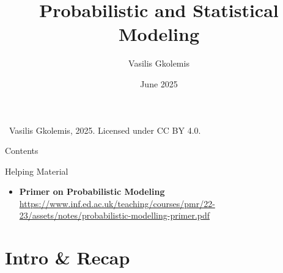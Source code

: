 \documentclass{beamer}
\title{Probabilistic and Statistical Modeling}
\author{Vasilis Gkolemis}
\institute{ATHENA RC | HUA}
\date{June 2025}
\begin{document}
\begin{frame}
  \titlepage
  \vfill
  \footnotesize
  \textcopyright\
  Vasilis Gkolemis, 2025. Licensed under CC BY 4.0.
\end{frame}

\begin{frame}{Contents}
  \tableofcontents
\end{frame}


\begin{frame}{Helping Material}
  \begin{itemize}
    \item \textbf{Primer on Probabilistic Modeling} \url{https://www.inf.ed.ac.uk/teaching/courses/pmr/22-23/assets/notes/probabilistic-modelling-primer.pdf}
  \end{itemize}
\end{frame}


\section{Intro \& Recap}
\end{document}
